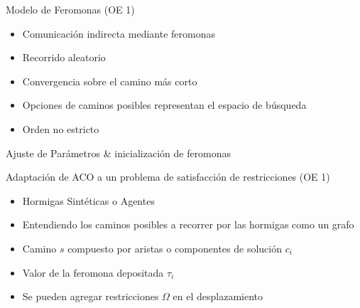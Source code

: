 \begin{frame}{Modelo de Feromonas (OE 1)}
\small
\begin{itemize}
    \item Comunicaci\'on indirecta mediante feromonas
    \item Recorrido aleatorio
    \item Convergencia sobre el camino m\'as corto
    \item Opciones de caminos posibles representan el espacio de b\'usqueda
    \item Orden no estricto
\end{itemize}
    \begin{algorithm}[H]
    \SetAlgoLined
     Ajuste de Par\'ametros \& inicializaci\'on de feromonas\;
     \caption{Algoritmo metaheur\'istica ACO}\label{ACO-Algo}
    \end{algorithm}
\end{frame}

\begin{frame}{Adaptaci\'on de ACO a un problema de satisfacci\'on de restricciones (OE 1)}
    \begin{itemize}
        \item Hormigas Sint\'eticas o Agentes
        \item Entendiendo los caminos posibles a recorrer por las hormigas como un grafo
        \item Camino $s$ compuesto por aristas o componentes de soluci\'on $c_i$
        \item Valor de la feromona depositada $\tau_{i}$
        \item Se pueden agregar restricciones $\Omega$ en el desplazamiento
    \end{itemize}
\end{frame}

